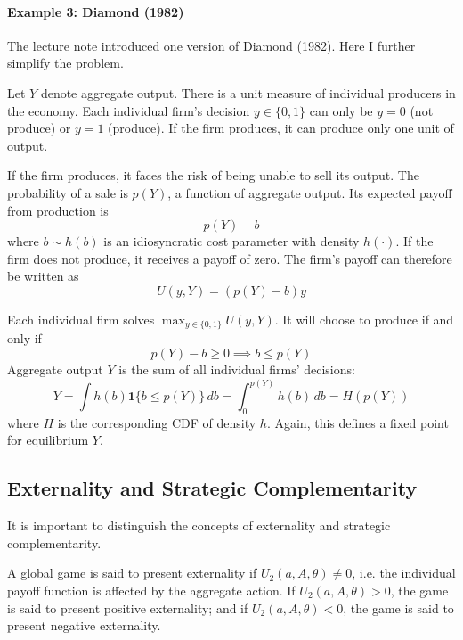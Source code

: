 \documentclass[12pt]{article}
\begin{document}
\paragraph{Example 3: Diamond (1982) \\ [6pt]}

The lecture note introduced one version of Diamond (1982). Here I further simplify the problem. 

Let $Y$ denote aggregate output. There is a unit measure of individual producers in the economy. Each individual firm's decision $y \in \{0,1\}$ can only be $y=0$ (not produce) or $y=1$ (produce). If the firm produces, it can produce only one unit of output. 

If the firm produces, it faces the risk of being unable to sell its output. The probability of a sale is $p(Y)$, a function of aggregate output. Its expected payoff from production is
\begin{equation}
	p(Y) - b
\end{equation}
where $b \sim h(b)$ is an idiosyncratic cost parameter with density $h(\cdot)$. If the firm does not produce, it receives a payoff of zero. The firm's payoff can therefore be written as
\begin{equation}
	U(y, Y) = (p(Y) - b) y
\end{equation}

Each individual firm solves $\max_{y \in \{0,1\}} U(y, Y)$. It will choose to produce if and only if
\begin{equation}
	p(Y) - b \geq 0 \implies b \leq p(Y)
\end{equation}
Aggregate output $Y$ is the sum of all individual firms' decisions:
\begin{equation}
	Y = \int h(b) \mathbf{1}\{b \leq p(Y) \} \, db = \int_0^{p(Y)} h(b) \, db = H(p(Y))
\end{equation}
where $H$ is the corresponding CDF of density $h$. Again, this defines a fixed point for equilibrium $Y$. 

\subsection{Externality and Strategic Complementarity}

It is important to distinguish the concepts of externality and strategic complementarity. 

\begin{definition}[Externality]
	A global game is said to present externality if $U_2(a, A, \theta) \neq 0$, i.e. the individual payoff function is affected by the aggregate action. If $U_2(a, A,\theta) > 0$, the game is said to present positive externality; and if $U_2(a, A, \theta) < 0$, the game is said to present negative externality. 
\end{definition}
 
\end{document}
